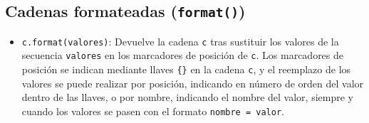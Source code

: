 \documentclass[
  spanish,
  a4paper,
]{scrreport}
\newenvironment{Shaded}{\begin{snugshade}}{\end{snugshade}}
\newcommand{\BuiltInTok}[1]{\textcolor[rgb]{0.00,0.23,0.31}{#1}}
\newcommand{\CommentTok}[1]{\textcolor[rgb]{0.37,0.37,0.37}{#1}}
\newcommand{\FloatTok}[1]{\textcolor[rgb]{0.68,0.00,0.00}{#1}}
\newcommand{\NormalTok}[1]{\textcolor[rgb]{0.00,0.23,0.31}{#1}}
\newcommand{\OperatorTok}[1]{\textcolor[rgb]{0.37,0.37,0.37}{#1}}
\newcommand{\SpecialCharTok}[1]{\textcolor[rgb]{0.37,0.37,0.37}{#1}}
\newcommand{\StringTok}[1]{\textcolor[rgb]{0.13,0.47,0.30}{#1}}
\providecommand{\tightlist}{%
  \setlength{\itemsep}{0pt}\setlength{\parskip}{0pt}}
\begin{document}
\subsection{\texorpdfstring{Cadenas formateadas
(\texttt{format()})}{Cadenas formateadas (format())}}\label{cadenas-formateadas-format}

\begin{itemize}
\tightlist
\item
  \texttt{c.format(valores)}: Devuelve la cadena \texttt{c} tras
  sustituir los valores de la secuencia \texttt{valores} en los
  marcadores de posición de \texttt{c}. Los marcadores de posición se
  indican mediante llaves \texttt{\{\}} en la cadena \texttt{c}, y el
  reemplazo de los valores se puede realizar por posición, indicando en
  número de orden del valor dentro de las llaves, o por nombre,
  indicando el nombre del valor, siempre y cuando los valores se pasen
  con el formato \texttt{nombre\ =\ valor}.
\end{itemize}

\begin{Shaded}
\end{Shaded}
\end{document}
